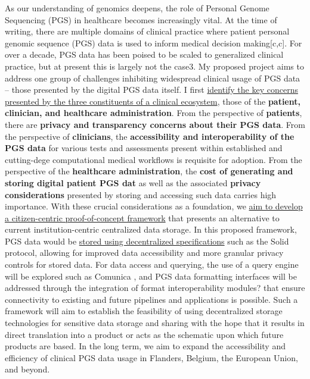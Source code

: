 \documentclass{article}
\begin{document}
As our understanding of genomics deepens, the role of Personal Genome Sequencing (PGS) in healthcare becomes increasingly vital. At the time of writing, there are multiple domains of clinical practice where patient personal genomic sequence (PGS) data is used to inform medical decision making[c,c]. For over a decade, PGS data has been poised to be scaled to generalized clinical practice, but at present this is largely not the case3. My proposed project aims to address one group of challenges inhibiting widespread clinical usage of PGS data -- those presented by the digital PGS data itself. I first \underline{identify the key concerns presented by the three constituents of a clinical ecosystem}, those of the \textbf{patient, clinician, and healthcare administration}. From the perspective of \textbf{patients}, there are \textbf{privacy and transparency concerns about their PGS data}. From the perspective of \textbf{clinicians}, the \textbf{accessibility and interoperability of the PGS data} for various tests and assessments present within established and cutting-dege computational medical workflows is requisite for adoption. From the perspective of the \textbf{healthcare administration}, the \textbf{cost of generating and storing digital patient PGS dat} as well as the associated \textbf{privacy considerations} presented by storing and accessing such data carries high importance. With these crucial considerations as a foundation, we  \underline{aim to develop a citizen-centric proof-of-concept framework} that presents an alternative to current institution-centric centralized data storage. In this proposed framework, PGS data would be \underline{stored using decentralized specifications} such as the Solid protocol, allowing for improved data accessibility and more granular privacy controls for stored data. For data access and querying, the use of a query engine will be explored such as Comunica , and PGS data formatting interfaces will be addressed through the integration of format interoperability modules? that ensure connectivity to existing and future pipelines and applications is possible. Such a framework will aim to establish the feasibility of using decentralized storage technologies for sensitive data storage and sharing with the hope that it results in direct translation into a product or acts as the schematic upon which future products are based. In the long term, we aim to expand the accessibility and efficiency of clinical PGS data usage in Flanders, Belgium, the European Union, and beyond.
\end{document}
